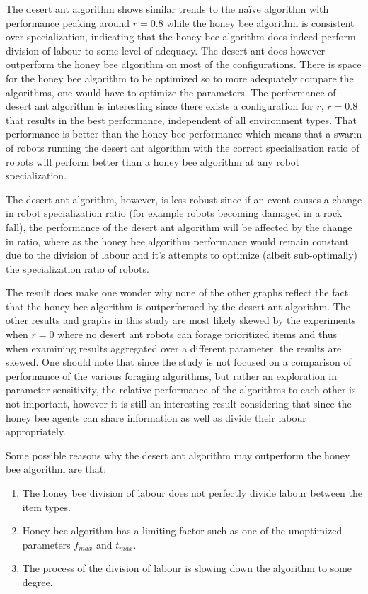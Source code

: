 The desert ant algorithm shows similar trends to the na\"ive algorithm with performance peaking around $r=0.8$ while the honey bee algorithm is consistent over specialization, indicating that the honey bee algorithm does indeed perform division of labour to some level of adequacy. The desert ant does however outperform the honey bee algorithm on most of the configurations. There is space for the honey bee algorithm to be optimized so to more adequately compare the algorithms, one would have to optimize the parameters. 
The performance of desert ant algorithm is interesting since there exists a configuration for $r$, $r=0.8$ that results in the best performance, independent of all environment types. That performance is better than the honey bee performance which means that a swarm of robots running the desert ant algorithm with the correct specialization ratio of robots will perform better than a honey bee algorithm at any robot specialization. 

The desert ant algorithm, however, is less robust since if an event causes a change in robot specialization ratio (for example robots becoming damaged in a rock fall), the performance of the desert ant algorithm will be affected by the change in ratio, where as the honey bee algorithm performance would remain constant due to the division of labour and it's attempts to optimize (albeit sub-optimally) the specialization ratio of robots. 

The result does make one wonder why none of the other graphs reflect the fact that the honey bee algorithm is outperformed by the desert ant algorithm. The other results and graphs in this study are most likely skewed by the experiments when $r=0$ where no desert ant robots can forage prioritized items and thus when examining results aggregated over a different parameter, the results are skewed. One should note that since the study is not focused on a comparison of performance of the various foraging algorithms, but rather an exploration in parameter sensitivity, the relative performance of the algorithms to each other is not important, however it is still an interesting result considering that since the honey bee agents can share information as well as divide their labour appropriately. 
 
Some possible reasons why the desert ant algorithm may outperform the honey bee algorithm are that:
\begin{enumerate}
	\item The honey bee division of labour does not perfectly divide labour between the item types.
	\item Honey bee algorithm has a limiting factor such as one of the unoptimized parameters $f_{max}$ and $t_{max}$. 
	\item The process of the division of labour is slowing down the algorithm to some degree.
\end{enumerate}

